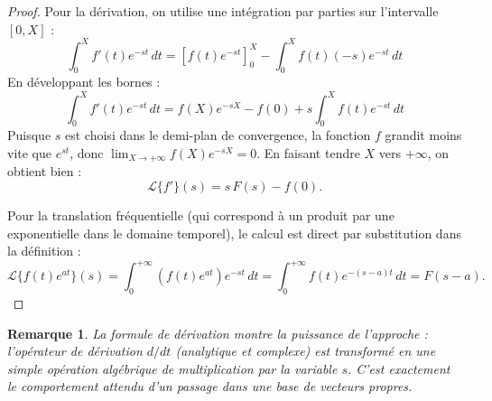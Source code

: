 \documentclass[11pt, a4paper]{article}
\theoremstyle{plain_style}
\newtheorem{remarque}{Remarque}
\begin{document}
\begin{proof}
Pour la dérivation, on utilise une intégration par parties sur l'intervalle $[0, X]$ :
\[
  \int_0^X f'(t)e^{-st}\,dt = \left[ f(t)e^{-st} \right]_0^X - \int_0^X f(t)(-s)e^{-st}\,dt
\]
En développant les bornes :
\[
  \int_0^X f'(t)e^{-st}\,dt = f(X)e^{-sX} - f(0) + s\int_0^X f(t)e^{-st}\,dt
\]
Puisque $s$ est choisi dans le demi-plan de convergence, la fonction $f$ grandit moins vite que $e^{st}$, donc $\lim_{X \to +\infty} f(X)e^{-sX} = 0$. En faisant tendre $X$ vers $+\infty$, on obtient bien :
\[
  \mathcal{L}\{f'\}(s) = s\,F(s) - f(0).
\]

Pour la translation fréquentielle (qui correspond à un produit par une exponentielle dans le domaine temporel), le calcul est direct par substitution dans la définition :
\[
  \mathcal{L}\{f(t)e^{at}\}(s) = \int_0^{+\infty} \left(f(t)e^{at}\right)e^{-st}\,dt = \int_0^{+\infty} f(t)e^{-(s-a)t}\,dt = F(s-a).
\]
\end{proof}

\begin{remarque}
La formule de dérivation montre la puissance de l'approche : l'opérateur de dérivation $d/dt$ (analytique et complexe) est transformé en une simple opération algébrique de multiplication par la variable $s$. C'est exactement le comportement attendu d'un passage dans une base de vecteurs propres.
\end{remarque}
\end{document}
